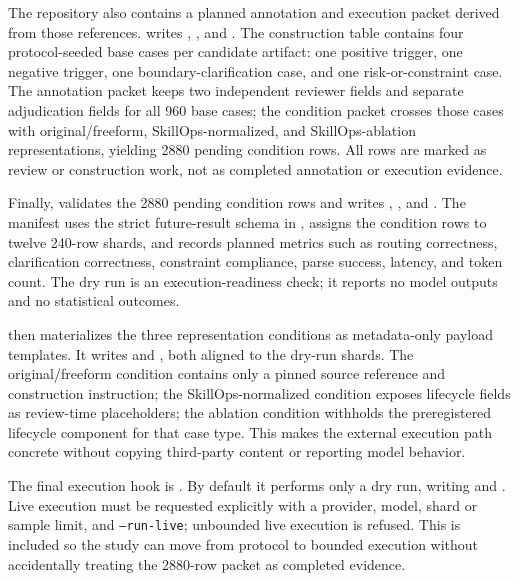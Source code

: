 \documentclass[11pt]{article}
\begin{document}
The repository also contains a planned annotation and execution packet derived
from those references. 
writes ,
, and
. The construction table
contains four protocol-seeded base cases per candidate artifact: one positive
trigger, one negative trigger, one boundary-clarification case, and one
risk-or-constraint case. The annotation packet keeps two independent reviewer
fields and separate adjudication fields for all 960 base cases; the condition
packet crosses those cases with original/freeform, SkillOps-normalized, and
SkillOps-ablation representations, yielding 2880 pending condition rows. All
rows are marked as review or construction work, not as completed annotation or
execution evidence.

Finally,  validates the 2880
pending condition rows and writes
,
, and
. The manifest
uses the strict future-result schema in
, assigns the
condition rows to twelve 240-row shards, and records planned metrics such as
routing correctness, clarification correctness, constraint compliance, parse
success, latency, and token count. The dry run is an execution-readiness check;
it reports no model outputs and no statistical outcomes.

 then materializes the three
representation conditions as metadata-only payload templates. It writes
 and
, both
aligned to the dry-run shards. The original/freeform condition contains only a
pinned source reference and construction instruction; the SkillOps-normalized
condition exposes lifecycle fields as review-time placeholders; the ablation
condition withholds the preregistered lifecycle component for that case type.
This makes the external execution path concrete without copying third-party
content or reporting model behavior.

The final execution hook is .
By default it performs only a dry run, writing
 and
. Live execution must be
requested explicitly with a provider, model, shard or sample limit, and
\texttt{--run-live}; unbounded live execution is refused. This is included so
the study can move from protocol to bounded execution without accidentally
treating the 2880-row packet as completed evidence.
\end{document}
